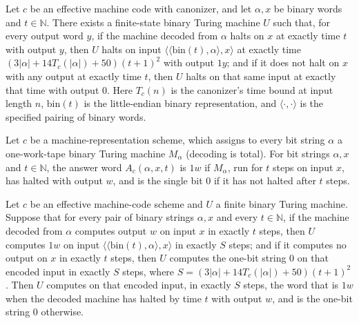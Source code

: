 \begin{theorem}
\label{Complexity.timed_universal_quantitative}
\leanok
{}
Let $c$ be an effective machine code with canonizer, and let $\alpha,x$ be binary words
and $t\in\mathbb{N}$. There exists a finite-state binary Turing machine $U$ such that,
for every output word $y$, if the machine decoded from $\alpha$ halts on $x$ at exactly
time $t$ with output $y$, then $U$ halts on input
$\langle\langle\mathrm{bin}(t),\alpha\rangle,x\rangle$ at exactly time
$(3|\alpha|+14T_c(|\alpha|)+50)(t+1)^2$ with output $1y$; and if it does not halt on $x$
with any output at exactly time $t$, then $U$ halts on that same input at exactly that
time with output $0$. Here $T_c(n)$ is the canonizer's time bound at input length $n$,
$\mathrm{bin}(t)$ is the little-endian binary representation, and
$\langle\cdot,\cdot\rangle$ is the specified pairing of binary words.
\end{theorem}

\begin{definition}
\label{Complexity.tmsatAnswer}
\leanok
{}
Let $c$ be a machine-representation scheme, which assigns to every bit string $\alpha$ a one-work-tape binary Turing machine $M_\alpha$ (decoding is total). For bit strings $\alpha, x$ and $t \in \mathbb{N}$, the answer word $A_c(\alpha, x, t)$ is $1w$ if $M_\alpha$, run for $t$ steps on input $x$, has halted with output $w$, and is the single bit $0$ if it has not halted after $t$ steps.
\end{definition}

\begin{lemma}
\label{Complexity.tmsat_simulator_total}
\leanok
{}
Let $c$ be an effective machine-code scheme and $U$ a finite binary Turing machine.
Suppose that for every pair of binary strings $\alpha,x$ and every $t\in\mathbb{N}$, if
the machine decoded from $\alpha$ computes output $w$ on input $x$ in exactly $t$ steps,
then $U$ computes $1w$ on input $\langle\langle\mathrm{bin}(t),\alpha\rangle,x\rangle$
in exactly $S$ steps; and if it computes no output on $x$ in exactly $t$ steps, then $U$
computes the one-bit string $0$ on that encoded input in exactly $S$ steps, where
$S=(3|\alpha|+14T_c(|\alpha|)+50)(t+1)^2$. Then $U$ computes on that encoded input, in
exactly $S$ steps, the word that is $1w$ when the decoded machine has halted by time $t$
with output $w$, and is the one-bit string $0$ otherwise.
\end{lemma}

